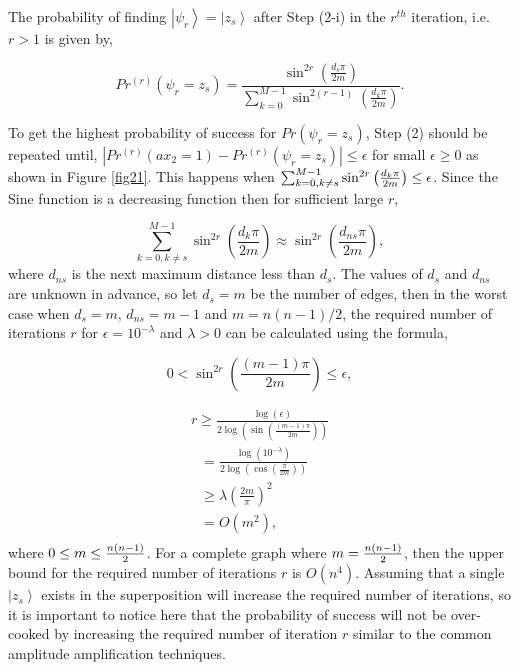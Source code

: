 \documentclass[a4paper]{article}
\begin{document}
The probability of finding $\left|\psi_r \right\rangle=\left|z_s \right\rangle$ after Step (2-i) in the $r^{th}$ iteration, i.e. $r>1$ is given by,

\begin{equation}
Pr^{(r)}{(\psi_{r}  = z_s)}  = \frac{{{\sin ^{2r} \left( {\frac{{d_s \pi }}{{2m}}} \right)} }}{{\sum\limits_{k = 0}^{M - 1} {\sin ^{2(r - 1)} \left( {\frac{{d_k \pi }}{{2m}}} \right)} }}.
\end{equation} 

To get the highest probability of success for $Pr{(\psi_{r}  = z_s)}$, Step (2) should be repeated until, 
$\left| Pr^{(r)}{(ax_2  = 1)}  - Pr^{(r)}{(\psi_r  = z_s)} \right| \le \epsilon$ for small $\epsilon \ge 0$ as shown in Figure \ref{fig21}. 
This happens when 
$\sum\nolimits_{k = 0,k\ne s}^{M - 1} {\sin ^{2r} \left( {{\textstyle{{d_k \pi } \over {2m}}}} \right)}  \le \epsilon$. 
Since the Sine function is a decreasing function then for sufficient large $r$,

\begin{equation}
\sum\limits_{k = 0,k\ne s}^{M - 1} {\sin ^{2r} \left( {\frac{{d_k \pi }}{{2m}}} \right)}  \approx \sin ^{2r} \left( {\frac{{d_{ns} \pi }}{{2m}}} \right),
\end{equation} 
\noindent
where $d_{ns}$ is the next maximum distance less than $d_s$. The values of $d_s$ and $d_{ns}$ are unknown in advance, so let $d_s=m$ be the number of edges, 
then in the worst case when $d_s=m$, $d_{ns}=m-1$ and $m=n(n-1)/2$, the required number of iterations $r$ 
for $\epsilon  = 10^{ - \lambda }$ and $\lambda>0$ can be calculated using the formula,

\begin{equation}
0 < \sin ^{2r} \left( {\frac{{(m-1) \pi }}{{2m}}} \right) \le \epsilon,
\end{equation} 

\begin{equation}
\begin{array}{l}
 r \ge \frac{{\log \left( \epsilon  \right)}}{{2\log \left( {\sin \left( {\frac{{\left( {m - 1} \right)\pi }}{{2m}}} \right)} \right)}} \\ 
 \,\,\,\, = \frac{{\log \left( {10^{ - \lambda } } \right)}}{{2\log \left( {\cos \left( {\frac{\pi }{{2m}}} \right)} \right)}} \\ 
 \,\,\,\, \ge \lambda \left( {\frac{{2m}}{\pi }} \right)^2  \\
 \,\,\,\,=O\left( {m^2 } \right),\\
 \end{array}
\end{equation} 
\noindent
where $0 \le m \le {\textstyle{{n(n - 1)} \over 2}}$. For a complete graph where $m={\textstyle{{n(n - 1)} \over 2}}$, then the upper bound 
for the required number of iterations $r$ is $O\left( {n^4 } \right)$. Assuming that 
a single $\left|z_s \right\rangle$ exists in the superposition will increase the required number of iterations, 
so it is important to notice here that the probability of success will not be over-cooked by increasing the 
required number of iteration $r$ similar to the common amplitude 
amplification techniques.
\end{document}
